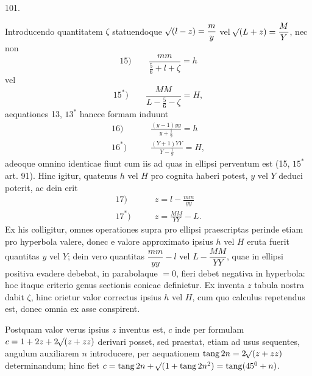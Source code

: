 \par{}\medskip
\hypertarget{native-141-article101}{}
\begin{center}101.\end{center}
Introducendo quantitatem $\zeta$ statuendoque $\mathord{{}^{}\!\surd}(l-z)=\dfrac my$ vel $\mathord{{}^{}\!\surd}(L+z)=\dfrac MY$, nec non
\[
\mathrm{15)}\qquad\frac{mm}{\tfrac56+l+\zeta}=h
\]
\noindent vel
\[
\mathrm{15^*)}\qquad\frac{MM}{L-\tfrac56-\zeta}=H,
\]
\noindent aequationes 13, $13^*$ hancce formam induunt
\[
\begin{aligned}
\mathrm{16)}\qquad&\frac{(y-1)yy}{y+\tfrac19}=h\\[.6em]
\mathrm{16^*)}\qquad&\frac{(Y+1)YY}{Y-\tfrac19}=H,
\end{aligned}
\]
\noindent adeoque omnino identicae fiunt cum iis ad quas in ellipsi perventum est (15, $15^*$ art. 91). Hinc igitur, quatenus $h$ vel $H$ pro cognita haberi potest, $y$ vel $Y$ deduci poterit, ac dein erit
\[
\begin{aligned}
\mathrm{17)}\qquad&z=l-\frac{mm}{yy}\\[.6em]
\mathrm{17^*)}\qquad&z=\frac{MM}{YY}-L.
\end{aligned}
\]
\noindent Ex his colligitur, omnes operationes supra pro ellipsi praescriptas perinde etiam pro hyperbola valere, donec e valore approximato ipsius $h$ vel $H$ eruta fuerit quantitas $y$ vel $Y$; dein vero quantitas $\dfrac{mm}{yy}-l$ vel $L-\dfrac{MM}{YY}$, quae in ellipsi positiva evadere debebat, in parabolaque $=0$, fieri debet negativa in hyperbola: hoc itaque criterio genus sectionis conicae definietur. Ex inventa $z$ tabula nostra dabit $\zeta$, hinc orietur valor correctus ipsius $h$ vel $H$, cum quo calculus repetendus est, donec omnia ex asse conspirent.
\par
Postquam valor verus ipsius $z$ inventus est, $c$ inde per formulam $c=1+2z+2\mathord{{}^{}\!\surd}(z+zz)$ derivari posset, sed praestat, etiam ad usus sequentes, angulum auxiliarem $n$ introducere, per aequationem $\operatorname{tang}2n=2\mathord{{}^{}\!\surd}(z+zz)$ determinandum; hinc fiet $c=\operatorname{tang}2n+\mathord{{}^{}\!\surd}(1+\operatorname{tang}2n^2)=\operatorname{tang}(45^0+n)$.
